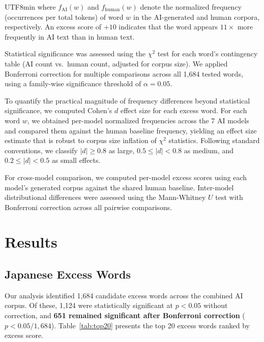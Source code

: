 \documentclass[11pt,a4paper]{article}
\begin{document}
\begin{CJK}{UTF8}{min}
\noindent where $f_{\text{AI}}(w)$ and $f_{\text{human}}(w)$ denote the normalized frequency (occurrences per total tokens) of word $w$ in the AI-generated and human corpora, respectively. An excess score of $+10$ indicates that the word appears $11\times$ more frequently in AI text than in human text.

Statistical significance was assessed using the $\chi^2$ test for each word's contingency table (AI count vs.\ human count, adjusted for corpus size). We applied Bonferroni correction for multiple comparisons across all 1,684 tested words, using a family-wise significance threshold of $\alpha = 0.05$.

To quantify the practical magnitude of frequency differences beyond statistical significance, we computed Cohen's $d$ effect size for each excess word. For each word $w$, we obtained per-model normalized frequencies across the 7 AI models and compared them against the human baseline frequency, yielding an effect size estimate that is robust to corpus size inflation of $\chi^2$ statistics. Following standard conventions, we classify $|d| \geq 0.8$ as large, $0.5 \leq |d| < 0.8$ as medium, and $0.2 \leq |d| < 0.5$ as small effects.

For cross-model comparison, we computed per-model excess scores using each model's generated corpus against the shared human baseline. Inter-model distributional differences were assessed using the Mann-Whitney $U$ test with Bonferroni correction across all pairwise comparisons.

\section{Results}

\subsection{Japanese Excess Words}

Our analysis identified 1,684 candidate excess words across the combined AI corpus. Of these, 1,124 were statistically significant at $p < 0.05$ without correction, and \textbf{651 remained significant after Bonferroni correction} ($p < 0.05 / 1{,}684$). Table~\ref{tab:top20} presents the top 20 excess words ranked by excess score.


\end{CJK}
\end{document}
